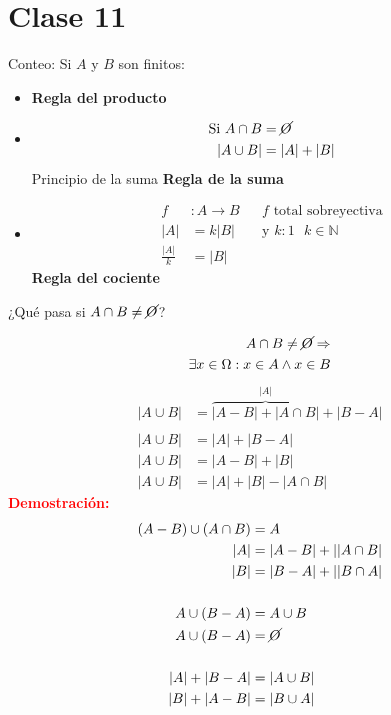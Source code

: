 \documentclass[../main.tex]{subfiles}
\begin{document}
\chapter*{Clase 11}%

\thispagestyle{fancy}

Conteo: Si $A$ y $B$ son finitos:
\begin{itemize}
	\item {} \textbf{Regla del producto}
	\item \dobledef
		{
			\begin{align*}
				\text{Si }A\cap B &= \cancel{O}\\
				|A\cup B| &= |A|+|B|
			\end{align*}
		}
		{Principio de la suma} \textbf{Regla de la suma}
	\item
		\begin{align*}
			f&:A \longrightarrow B && \text{$f$ total sobreyectiva}\\
			|A| &= k|B| && \text{y $k:1$ $k\in\mathbb{N}$}\\
			\frac{|A|}{k} &= |B|
		\end{align*}
		\textbf{Regla del cociente}
\end{itemize}

¿Qué pasa si $A\cap B \neq \cancel{O}$?

\textcolor{red}
{
	\begin{align*}
		A\cap B \neq \cancel{O} \Rightarrow\\
		\exists x \in \Omega:x\in A \wedge x \in B
	\end{align*}
}
\begin{align*}
	|A\cup B| &= \overbrace{|A-B|+|A\cap B|}^{|A|}+|B-A|\\
	\\
	|A\cup B| &= |A| + |B-A|\\
	|A\cup B| &= |A-B|+|B|\\
	|A\cup B| &= |A|+|B|- |A\cap B|
\end{align*}
\textbf{\textcolor{red}{Demostración:}}
\begin{align*}
	(A-B)\cup(A\cap B) &= A\\
	|A| &= |A-B|+||A\cap B|\\
	|B| &= |B-A|+||B\cap A|\\
	\\
	A\cup(B-A) &= A\cup B\\
	A\cup(B-A) &= \cancel{O}\\
	\\
	|A|+|B-A| &= |A\cup B|\\
	|B|+|A-B| &= |B\cup A|
\end{align*}
\end{document}
